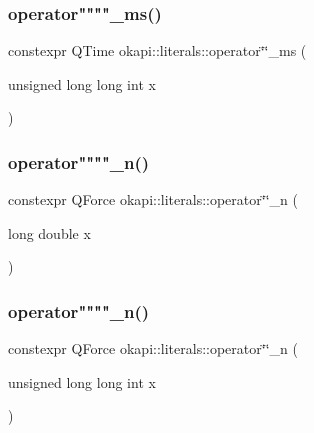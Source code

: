 \mbox{\label{namespaceokapi_1_1literals_a3051bde71591186f767c4f1000044b5e}} 
\subsubsection{\texorpdfstring{operator""""\_ms()}{operator""\_ms()}\hspace{0.1cm}{\footnotesize\ttfamily [2/2]}}
{\footnotesize\ttfamily constexpr Q\+Time okapi\+::literals\+::operator\char`\"{}\char`\"{}\+\_\+ms (\begin{DoxyParamCaption}\item[{unsigned long long int}]{x }\end{DoxyParamCaption})}

\mbox{\label{namespaceokapi_1_1literals_af29760df0e8f486842836e96f6eb073e}} 
\subsubsection{\texorpdfstring{operator""""\_n()}{operator""\_n()}\hspace{0.1cm}{\footnotesize\ttfamily [1/2]}}
{\footnotesize\ttfamily constexpr Q\+Force okapi\+::literals\+::operator\char`\"{}\char`\"{}\+\_\+n (\begin{DoxyParamCaption}\item[{long double}]{x }\end{DoxyParamCaption})}

\mbox{\label{namespaceokapi_1_1literals_a5b41173a8aa88f8f5734b49468a96fa8}} 
\subsubsection{\texorpdfstring{operator""""\_n()}{operator""\_n()}\hspace{0.1cm}{\footnotesize\ttfamily [2/2]}}
{\footnotesize\ttfamily constexpr Q\+Force okapi\+::literals\+::operator\char`\"{}\char`\"{}\+\_\+n (\begin{DoxyParamCaption}\item[{unsigned long long int}]{x }\end{DoxyParamCaption})}

